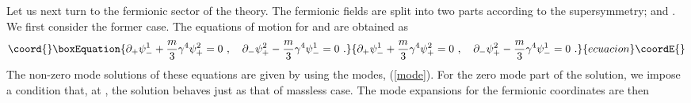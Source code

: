 \documentclass[a4paper,12pt]{article}
\numberwithin{equation}{section}
\begin{document}
Let us next turn to the fermionic sector of the theory. The fermionic
fields are split into two parts according to the \coordHE{}
supersymmetry; \coordHE{} and \coordHE{}.  We
first consider the former case.  The equations of motion for
\coordHE{} and \coordHE{} are obtained as
\begin{equation}\coord{}\boxEquation{
\partial_+ \psi^1_- + \frac{m}{3} \gamma^4 \psi^2_+ = 0 ~,~~~
\partial_- \psi^2_+ - \frac{m}{3} \gamma^4 \psi^1_- = 0 ~.
\label{feom}
}{
\partial_+ \psi^1_- + \frac{m}{3} \gamma^4 \psi^2_+ = 0 ~,~~~
\partial_- \psi^2_+ - \frac{m}{3} \gamma^4 \psi^1_- = 0 ~.
}{ecuacion}\coordE{}\end{equation}
The non-zero mode solutions of these equations are given by using the
modes, (\ref{mode}). For the zero mode part of the solution, we impose
a condition that, at \coordHE{}, the solution behaves just as that of
massless case.  The mode expansions for the fermionic coordinates are
then
\end{document}
